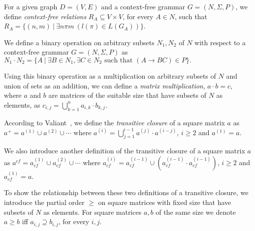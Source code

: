 For a given graph $D = (V, E)$ and a context-free grammar $G = (N, \Sigma, P)$, we define \textit{context-free relations} $R_A \subseteq V \times V$, for every $A \in N$, such that $R_A = \{(n,m)~|~\exists n \pi m~(l(\pi) \in L(G_A))\}$.

We define a binary operation on arbitrary subsets $N_1 , N_2$ of $N$ with respect to a context-free grammar $G = (N, \Sigma, P)$ as $N_1 \cdot N_2 = \{A~|~\exists B \in N_1, \exists C \in N_2 \text{ such that }(A \rightarrow B C) \in P\}.$

Using this binary operation as a multiplication on arbitrary subsets of $N$ and union of sets as an addition, we can define a \textit{matrix multiplication}, $a \cdot b = c$, where $a$ and $b$ are matrices of the suitable size that have subsets of $N$ as elements, as $c_{i,j} = \bigcup^{n}_{k=1}{a_{i,k} \cdot b_{k,j}}$.

According to Valiant~\cite{valiant}, we define the \textit{transitive closure} of a square matrix $a$ as $a^+ = a^{(1)} \cup a^{(2)} \cup \cdots$ where $a^{(i)} = \bigcup^{i-1}_{j=1}{a^{(j)} \cdot a^{(i-j)}}$, $i \ge 2$ and $a^{(1)} = a$.

We also introduce another definition of the transitive closure of a square matrix $a$ as $a^{cf} = a^{(1)}_{cf} \cup a^{(2)}_{cf} \cup \cdots$ where $a^{(i)}_{cf} = a^{(i-1)}_{cf} \cup (a^{(i-1)}_{cf} \cdot a^{(i-1)}_{cf})$, $i \ge 2$ and $a^{(1)}_{cf} = a$.

To show the relationship between these two definitions of a transitive closure, we introduce the partial order $\geq$ on square matrices with fixed size that have subsets of $N$ as elements. For square matrices $a, b$ of the same size we denote $a \geq b$ iff $a_{i,j} \supseteq b_{i,j}$, for every $i, j$.

